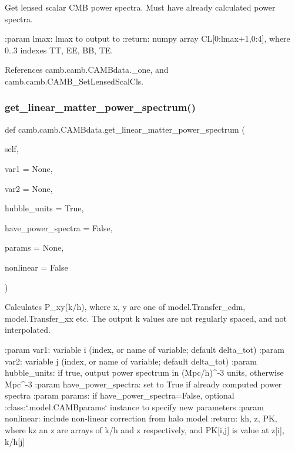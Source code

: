 \begin{DoxyVerb}Get lensed scalar CMB power spectra. Must have already calculated power spectra.

:param lmax: lmax to output to
:return: numpy array CL[0:lmax+1,0:4], where 0..3 indexes TT, EE, BB, TE.
\end{DoxyVerb}
 

References camb.\+camb.\+C\+A\+M\+Bdata.\+\_\+one, and camb.\+camb.\+C\+A\+M\+B\+\_\+\+Set\+Lensed\+Scal\+Cls.

\mbox{\label{classcamb_1_1camb_1_1CAMBdata_a6bd8c498d329e23ebefc55648ad59ab2}} 
\subsubsection{\texorpdfstring{get\+\_\+linear\+\_\+matter\+\_\+power\+\_\+spectrum()}{get\_linear\_matter\_power\_spectrum()}}
{\footnotesize\ttfamily def camb.\+camb.\+C\+A\+M\+Bdata.\+get\+\_\+linear\+\_\+matter\+\_\+power\+\_\+spectrum (\begin{DoxyParamCaption}\item[{}]{self,  }\item[{}]{var1 = {\ttfamily None},  }\item[{}]{var2 = {\ttfamily None},  }\item[{}]{hubble\+\_\+units = {\ttfamily True},  }\item[{}]{have\+\_\+power\+\_\+spectra = {\ttfamily False},  }\item[{}]{params = {\ttfamily None},  }\item[{}]{nonlinear = {\ttfamily False} }\end{DoxyParamCaption})}

\begin{DoxyVerb}Calculates P_{xy}(k/h), where x, y are one of model.Transfer_cdm, model.Transfer_xx etc.
The output k values are not regularly spaced, and not interpolated.

:param var1: variable i (index, or name of variable; default delta_tot)
:param var2: variable j (index, or name of variable; default delta_tot)
:param hubble_units: if true, output power spectrum in (Mpc/h)^{-3} units, otherwise Mpc^{-3}
:param have_power_spectra: set to True if already computed power spectra
:param params: if have_power_spectra=False, optional :class:`.model.CAMBparams` instance to specify new parameters
:param nonlinear: include non-linear correction from halo model
:return: kh, z, PK, where kz an z are arrays of k/h and z respectively, and PK[i,j] is value at z[i], k/h[j]
\end{DoxyVerb}
 

